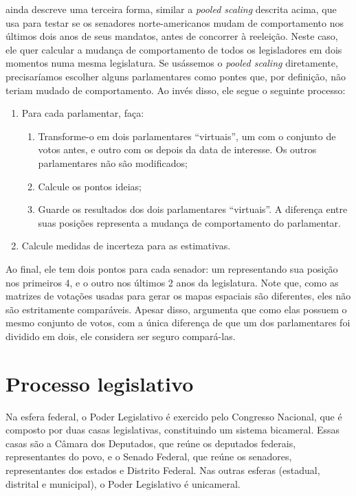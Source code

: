 \documentclass[a4paper,titlepage]{ppgi}\usepackage[]{graphicx}\usepackage[]{color}
\begin{document}
 ainda descreve uma terceira forma, similar a
\emph{pooled scaling} descrita acima, que usa para testar se os senadores
norte-americanos mudam de comportamento nos últimos dois anos de seus mandatos,
antes de concorrer à reeleição. Neste caso, ele quer calcular a mudança de
comportamento de todos os legisladores em dois momentos numa mesma legislatura.
Se usássemos o \emph{pooled scaling} diretamente, precisaríamos escolher alguns
parlamentares como pontes que, por definição, não teriam mudado de
comportamento. Ao invés disso, ele segue o seguinte processo:

\begin{enumerate}
  \item Para cada parlamentar, faça:
    \begin{enumerate}
      \item Transforme-o em dois parlamentares ``virtuais'', um com o conjunto
de votos antes, e outro com os depois da data de interesse. Os outros
parlamentares não são modificados;
      \item Calcule os pontos ideias;
      \item Guarde os resultados dos dois parlamentares ``virtuais''. A
diferença entre suas posições representa a mudança de comportamento do
parlamentar.
    \end{enumerate}
  \item Calcule medidas de incerteza para as estimativas.
\end{enumerate}

Ao final, ele tem dois pontos para cada senador: um representando sua posição
nos primeiros 4, e o outro nos últimos 2 anos da legislatura. Note que, como as
matrizes de votações usadas para gerar os mapas espaciais são diferentes, eles
não são estritamente comparáveis. Apesar disso, 
argumenta que como elas possuem o mesmo conjunto de votos, com a única
diferença de que um dos parlamentares foi dividido em dois, ele considera ser
seguro compará-las.

\section{Processo legislativo}
\label{cap:fundamentacao:processo-legislativo}

Na esfera federal, o Poder Legislativo é exercido pelo Congresso Nacional, que
é composto por duas casas legislativas, constituindo um sistema bicameral. Essas
casas são a Câmara dos Deputados, que reúne os deputados federais,
representantes do povo, e o Senado Federal, que reúne os senadores,
representantes dos estados e Distrito Federal. Nas outras esferas (estadual,
distrital e municipal), o Poder Legislativo é unicameral.
\end{document}
